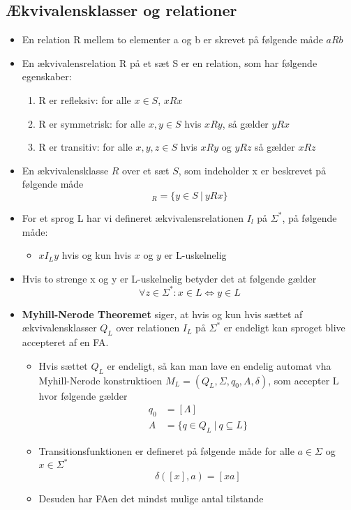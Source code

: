 \documentclass[a4, danish]{article}
\begin{document}
\subsection{Ækvivalensklasser og relationer}
\begin{itemize}
  \item En relation R mellem to elementer a og b er skrevet på følgende måde $aRb$
  \item En ækvivalensrelation R på et sæt S er en relation, som har følgende egenskaber:
  \begin{enumerate}
    \item R er refleksiv: for alle $x \in S$, $xRx$
    \item R er symmetrisk: for alle $x,y \in S$ hvis $xRy$, så gælder $yRx$
    \item R er transitiv: for alle $x,y,z \in S$ hvis $xRy$ og $yRz$ så gælder $xRz$
  \end{enumerate}
  \item En ækvivalensklasse $R$ over et sæt $S$, som indeholder x er beskrevet på følgende måde
  \begin{equation*}
    [x]_R=\{ y \in S \ | \ yRx  \}
  \end{equation*}
  \item For et sprog L har vi defineret ækvivalensrelationen $I_l$ på $\Sigma^*$, på følgende måde:
  \begin{itemize}
    \item $xI_Ly$ hvis og kun hvis $x$ og $y$ er L-uskelnelig
  \end{itemize}
  \item Hvis to strenge x og y er L-uskelnelig betyder det at følgende gælder
  \begin{equation*}
    \forall z \in \Sigma^*: x \in L \Leftrightarrow  y \in L
  \end{equation*}
  \item \textbf{Myhill-Nerode Theoremet} siger, at hvis og kun hvis sættet af ækvivalensklasser $Q_L$ over relationen $I_L$ på $\Sigma^*$ er endeligt kan sproget blive accepteret af en FA. 
  \begin{itemize}
    \item Hvis sættet $Q_L$ er endeligt, så kan man lave en endelig automat vha Myhill-Nerode konstruktioen $M_L=(Q_L,\Sigma,q_0,A,\delta)$, som accepter L hvor følgende gælder 
    \begin{align*}
      q_0 &= [\Lambda] \\
      A &= \{ q \in Q_L \ | \ q \subseteq L \}
    \end{align*}
    \item Transitionsfunktionen er defineret på følgende måde for alle $a \in \Sigma$ og $x \in \Sigma^*$
    \begin{equation*}
      \delta([x], a) = [xa]
    \end{equation*}
    \item Desuden har FAen det mindst mulige antal tilstande 
  \end{itemize}
\end{itemize}
\end{document}
